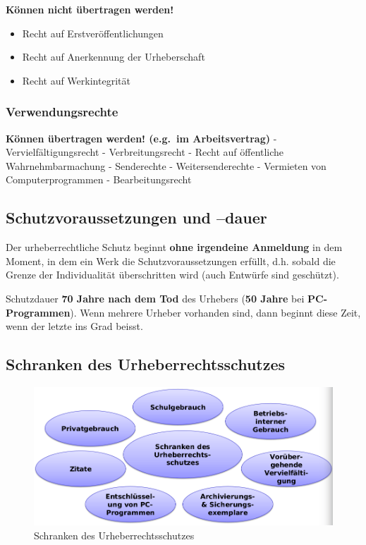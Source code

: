 \textbf{Können nicht übertragen werden!}

\begin{itemize}
\tightlist
\item
  Recht auf Erstveröffentlichungen
\item
  Recht auf Anerkennung der Urheberschaft
\item
  Recht auf Werkintegrität
\end{itemize}

\hypertarget{verwendungsrechte}{%
\subsubsection{Verwendungsrechte}\label{verwendungsrechte}}

\textbf{Können übertragen werden! (e.g.~im Arbeitsvertrag)} -
Vervielfältigungsrecht - Verbreitungsrecht - Recht auf öffentliche
Wahrnehmbarmachung - Senderechte - Weitersenderechte - Vermieten von
Computerprogrammen - Bearbeitungsrecht

\hypertarget{schutzvoraussetzungen-und-dauer}{%
\subsection{Schutzvoraussetzungen und
--dauer}\label{schutzvoraussetzungen-und-dauer}}

Der urheberrechtliche Schutz beginnt \textbf{ohne irgendeine Anmeldung}
in dem Moment, in dem ein Werk die Schutzvoraussetzungen erfüllt, d.h.
sobald die Grenze der Individualität überschritten wird (auch Entwürfe
sind geschützt).

Schutzdauer \textbf{70 Jahre nach dem Tod} des Urhebers (\textbf{50
Jahre} bei \textbf{PC-Programmen}). Wenn mehrere Urheber vorhanden sind,
dann beginnt diese Zeit, wenn der letzte ins Grad beisst.

\hypertarget{schranken-des-urheberrechtsschutzes}{%
\subsection{Schranken des
Urheberrechtsschutzes}\label{schranken-des-urheberrechtsschutzes}}

\begin{figure}
\centering
\includegraphics{figures/schrankenUrheberreschtsschutz.png}
\caption{Schranken des Urheberrechtsschutzes}
\end{figure}

